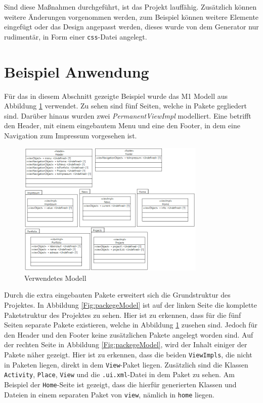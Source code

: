 Sind diese Maßnahmen durchgeführt, ist das Projekt lauffähig. Zusätzlich können
weitere Änderungen vorgenommen werden, zum Beispiel können weitere Elemente
eingefügt oder das Design angepasst werden, dieses wurde von dem Generator nur
rudimentär, in Form einer \texttt{css}-Datei angelegt.

\section{Beispiel Anwendung}
Für das in diesem Abschnitt gezeigte Beispiel wurde das M1 Modell aus Abbildung
\ref{Fig:ergModell} verwendet. Zu sehen sind fünf Seiten, welche in Pakete
gegliedert sind. Darüber hinaus wurden zwei \textit{PermanentViewImpl}
modelliert. Eine betrifft den Header, mit einem eingebautem Menu und eine den
Footer, in dem eine Navigation zum Impressum vorgesehen ist.

\begin{figure}[htbp]
\begin{center}
\includegraphics[width=0.8\textwidth]{./img/Model2.png}
\caption{Verwendetes Modell}\label{Fig:ergModell}
\end{center}
\end{figure}

Durch die extra eingebauten Pakete erweitert sich die Grundstruktur des
Projektes. In Abbildung \ref{Fig:packegeModel} ist auf der linken Seite die
komplette Paketstruktur des Projektes zu sehen. Hier ist zu erkennen, dass
für die fünf Seiten separate Pakete existieren, welche in Abbildung
\ref{Fig:ergModell} zusehen sind. Jedoch für den Header und den Footer keine
zusätzlichen Pakete angelegt worden sind. Auf der rechten Seite in Abbildung
\ref{Fig:packegeModel}, wird der Inhalt einiger der Pakete näher gezeigt. Hier
ist zu erkennen, dass die beiden \texttt{ViewImpls}, die nicht in Paketen
liegen, direkt in dem \texttt{View}-Paket liegen. Zusätzlich sind die Klassen
\texttt{Activity}, \texttt{Place}, \texttt{View} und die \texttt{.ui.xml}-Datei
in dem Paket zu sehen. Am Beispiel der \texttt{Home}-Seite ist gezeigt, dass die
hierfür generierten Klassen und Dateien in einem separaten Paket von
\texttt{view}, nämlich in \texttt{home} liegen.

